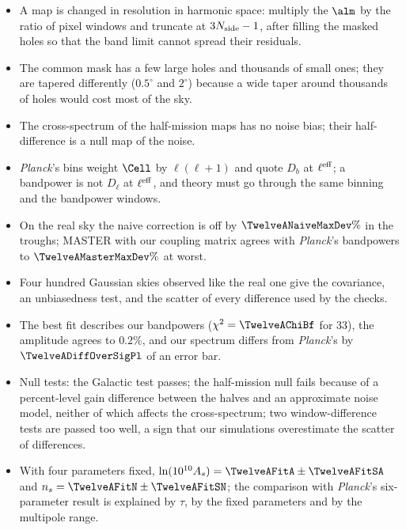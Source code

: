 \begin{recap}
\begin{itemize}[itemsep=2pt]
  \item A map is changed in resolution in harmonic space: multiply the $\alm$ by the ratio of pixel windows and truncate at
        $3N_{\rm side}-1$, after filling the masked holes so that the band limit cannot spread their residuals.
  \item The common mask has a few large holes and thousands of small ones; they are tapered differently ($0.5^\circ$ and $2^\circ$) because a
        wide taper around thousands of holes would cost most of the sky.
  \item The cross-spectrum of the half-mission maps has no noise bias; their half-difference is a null map of the noise.
  \item \textit{Planck}'s bins weight $\Cell$ by $\ell(\ell+1)$ and quote $D_b$ at $\ell^{\rm eff}$; a bandpower is not $D_\ell$ at $\ell^{\rm eff}$, and theory
        must go through the same binning and the bandpower windows.
  \item On the real sky the naive correction is off by $\TwelveANaiveMaxDev\%$ in the troughs; MASTER with our coupling matrix agrees with
        \textit{Planck}'s bandpowers to $\TwelveAMasterMaxDev\%$ at worst.
  \item Four hundred Gaussian skies observed like the real one give the covariance, an unbiasedness test, and the scatter of every
        difference used by the checks.
  \item The best fit describes our bandpowers ($\chi^2=\TwelveAChiBf$ for $33$), the amplitude agrees to $0.2\%$, and our spectrum differs from
        \textit{Planck}'s by $\TwelveADiffOverSigPl$ of an error bar.
  \item Null tests: the Galactic test passes; the half-mission null fails because of a percent-level gain difference between the halves
        and an approximate noise model, neither of which affects the cross-spectrum; two window-difference tests are passed too well,
        a sign that our simulations overestimate the scatter of differences.
  \item With four parameters fixed, $\ln(10^{10}A_s)=\TwelveAFitA\pm\TwelveAFitSA$ and $n_s=\TwelveAFitN\pm\TwelveAFitSN$; the comparison with
        \textit{Planck}'s six-parameter result is explained by $\tau$, by the fixed parameters and by the multipole range.
\end{itemize}
\end{recap}
